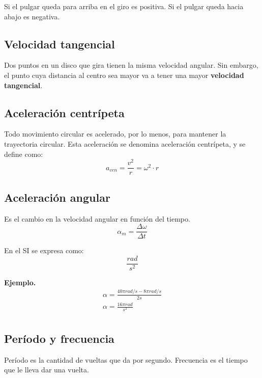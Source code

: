 \documentclass[12pt]{article}
\begin{document}
Si el pulgar queda para arriba en el giro es positiva.
Si el pulgar queda hacia abajo es negativa.

\subsection{Velocidad tangencial}

Dos puntos en un disco que gira tienen la misma velocidad angular.
Sin embargo,
el punto cuya distancia al centro sea mayor va a tener una mayor
\textbf{velocidad tangencial}.

\subsection{Aceleración centrípeta}

Todo movimiento circular es acelerado,
por lo menos,
para mantener la trayectoria circular.
Esta aceleración se denomina aceleración centrípeta,
y se define como:
\begin{equation}
    a_{cen}=\frac{v^{2}}{r} = \omega^{2}\cdot r
\end{equation}

\subsection{Aceleración angular}

Es el cambio en la velocidad angular en función del tiempo.
\begin{equation}
    \alpha_{m} = \frac{\Delta\omega}{\Delta t}
\end{equation}

En el SI se expresa como:
\begin{equation}
    \frac{rad}{s^{2}}
\end{equation}

\textbf{Ejemplo.}
\begin{align*}
    \alpha = \frac{40\pi rad/s - 8\pi rad/s}{2 s}\\
    \alpha = \frac{16\pi rad}{s^{2}}\\
\end{align*}

\subsection{Período y frecuencia}

Período es la cantidad de vueltas que da por segundo.
Frecuencia es el tiempo que le lleva dar una vuelta.
\end{document}
